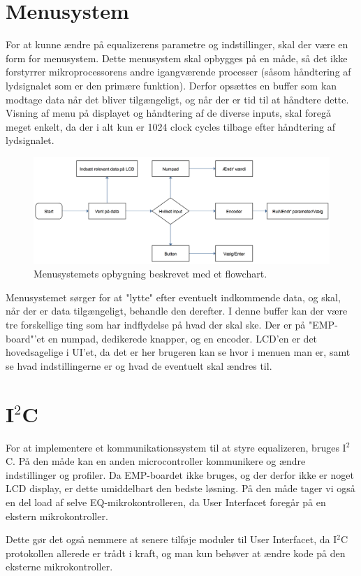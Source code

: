 \section{Menusystem}\label{sec:menu}
For at kunne ændre på equalizerens parametre og indstillinger, skal der være en form for menusystem. Dette menusystem skal opbygges på en måde, så det ikke forstyrrer mikroprocessorens andre igangværende processer (såsom håndtering af lydsignalet som er den primære funktion). Derfor opsættes en buffer som kan modtage data når det bliver tilgængeligt, og når der er tid til at håndtere dette. Visning af menu på displayet og håndtering af de diverse inputs, skal foregå meget enkelt, da der i alt kun er 1024 clock cycles tilbage efter håndtering af lydsignalet. \\

\begin{figure}[h]
	\centering
	\includegraphics[width=15cm]{billeder/ui_flowchart}
	\caption{Menusystemets opbygning beskrevet med et flowchart. }
\end{figure}

Menusystemet sørger for at "lytte" efter eventuelt indkommende data, og skal, når der er data tilgængeligt, behandle den derefter. I denne buffer kan der være tre forskellige ting som har indflydelse på hvad der skal ske. Der er på "EMP-board"'et en numpad, dedikerede knapper, og en encoder. LCD'en er det hovedsagelige i UI'et, da det er her brugeren kan se hvor i menuen man er, samt se hvad indstillingerne er og hvad de eventuelt skal ændres til.

\section{I$^2$C}\label{sec:i2c}
For at implementere et kommunikationssystem til at styre equalizeren, bruges I$^2$C. På den måde kan en anden microcontroller kommunikere og ændre indstillinger og profiler. Da EMP-boardet ikke bruges, og der derfor ikke er noget LCD display, er dette umiddelbart den bedste løsning. På den måde tager vi også en del load af selve EQ-mikrokontrolleren, da User Interfacet foregår på en ekstern mikrokontroller.

Dette gør det også nemmere at senere tilføje moduler til User Interfacet, da I$^2$C protokollen allerede er trådt i kraft, og man kun behøver at ændre kode på den eksterne mikrokontroller.